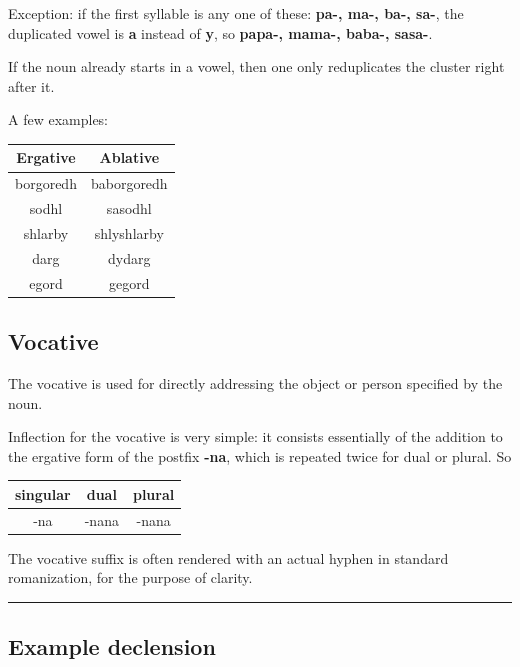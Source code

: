 \documentclass[10pt,oneside]{memoir}
\begin{document}
\begin{multicols}{2}
Exception: if the first syllable is any one of these: \textbf{pa-, ma-, ba-, sa-}, the duplicated vowel is \textbf{a} instead of \textbf{y}, so \textbf{papa-, mama-, baba-, sasa-}.

If the noun already starts in a vowel, then one only reduplicates the cluster right after it.

A few examples:

\begin{center}
    \begin{tabular}[]{c | c}
        Ergative & Ablative\\
        \hline
        borgoredh & baborgoredh\\
        sodhl & sasodhl\\
        shlarby & shlyshlarby\\
        darg & dydarg \\
        egord & gegord
    \end{tabular}
\end{center}


\subsection{Vocative}

The vocative is used for directly addressing the object or person specified by the noun.

\begin{minipage}{\columnwidth}

Inflection for the vocative is very simple: it consists essentially of the addition to the ergative form of the postfix \textbf{-na}, which is repeated twice for dual or plural. So\\

\begin{tabular}[]{c | c  | c}
    singular & dual & plural\\
    \hline
    -na & -nana & -nana
\end{tabular}

\end{minipage}

The vocative suffix is often rendered with an actual hyphen in standard romanization, for the purpose of clarity.


\vfill\null
\columnbreak

\end{multicols}
\hrule
\subsection{Example declension}
\end{document}
